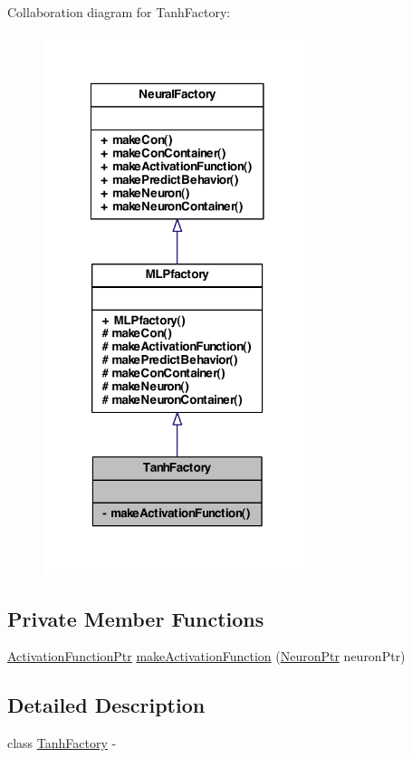 Collaboration diagram for TanhFactory:
\nopagebreak
\begin{figure}[H]
\begin{center}
\leavevmode
\includegraphics[width=222pt]{class_tanh_factory__coll__graph}
\end{center}
\end{figure}
\subsection*{Private Member Functions}
\begin{DoxyCompactItemize}
\item 
\hyperlink{_a_m_o_r_e_8h_a77602a0277a02e5769c3df0adc669b17}{ActivationFunctionPtr} \hyperlink{class_tanh_factory_a476450ea27b571e3548377afd1625372}{makeActivationFunction} (\hyperlink{_a_m_o_r_e_8h_ac1ea936c2c7728eb382278131652fef4}{NeuronPtr} neuronPtr)
\end{DoxyCompactItemize}


\subsection{Detailed Description}
class \hyperlink{class_tanh_factory}{TanhFactory} -\/ 

